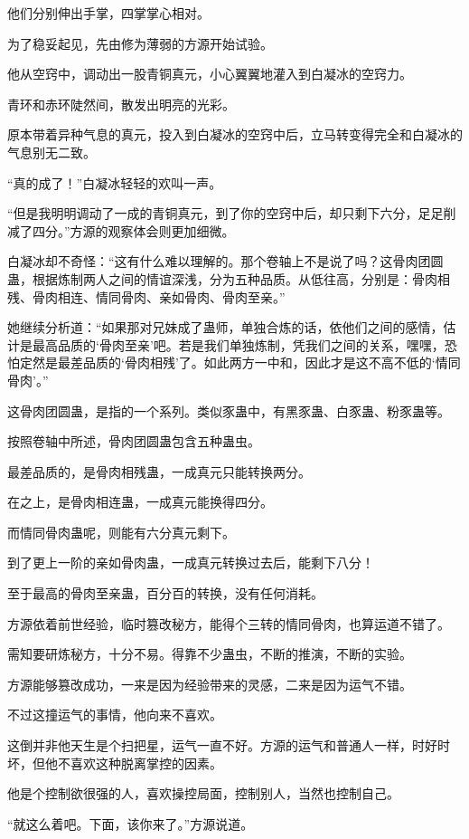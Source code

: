 \begin{this_body}
他们分别伸出手掌，四掌掌心相对。

为了稳妥起见，先由修为薄弱的方源开始试验。

他从空窍中，调动出一股青铜真元，小心翼翼地灌入到白凝冰的空窍力。

青环和赤环陡然间，散发出明亮的光彩。

原本带着异种气息的真元，投入到白凝冰的空窍中后，立马转变得完全和白凝冰的气息别无二致。

“真的成了！”白凝冰轻轻的欢叫一声。

“但是我明明调动了一成的青铜真元，到了你的空窍中后，却只剩下六分，足足削减了四分。”方源的观察体会则更加细微。

白凝冰却不奇怪：“这有什么难以理解的。那个卷轴上不是说了吗？这骨肉团圆蛊，根据炼制两人之间的情谊深浅，分为五种品质。从低往高，分别是：骨肉相残、骨肉相连、情同骨肉、亲如骨肉、骨肉至亲。”

她继续分析道：“如果那对兄妹成了蛊师，单独合炼的话，依他们之间的感情，估计是最高品质的‘骨肉至亲’吧。若是我们单独炼制，凭我们之间的关系，嘿嘿，恐怕定然是最差品质的‘骨肉相残’了。如此两方一中和，因此才是这不高不低的‘情同骨肉’。”

这骨肉团圆蛊，是指的一个系列。类似豕蛊中，有黑豕蛊、白豕蛊、粉豕蛊等。

按照卷轴中所述，骨肉团圆蛊包含五种蛊虫。

最差品质的，是骨肉相残蛊，一成真元只能转换两分。

在之上，是骨肉相连蛊，一成真元能换得四分。

而情同骨肉蛊呢，则能有六分真元剩下。

到了更上一阶的亲如骨肉蛊，一成真元转换过去后，能剩下八分！

至于最高的骨肉至亲蛊，百分百的转换，没有任何消耗。

方源依着前世经验，临时篡改秘方，能得个三转的情同骨肉，也算运道不错了。

需知要研炼秘方，十分不易。得靠不少蛊虫，不断的推演，不断的实验。

方源能够篡改成功，一来是因为经验带来的灵感，二来是因为运气不错。

不过这撞运气的事情，他向来不喜欢。

这倒并非他天生是个扫把星，运气一直不好。方源的运气和普通人一样，时好时坏，但他不喜欢这种脱离掌控的因素。

他是个控制欲很强的人，喜欢操控局面，控制别人，当然也控制自己。

“就这么着吧。下面，该你来了。”方源说道。


\end{this_body}
